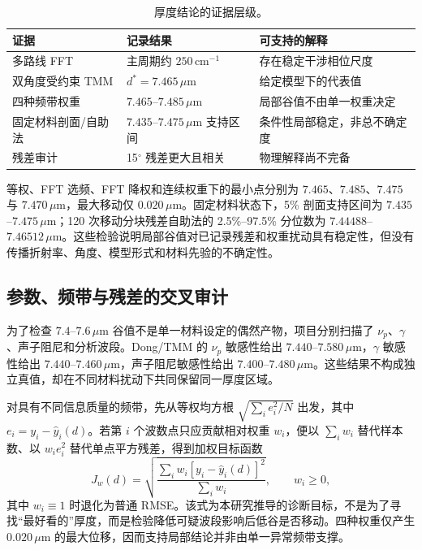 \documentclass[10pt,a4paper]{ctexart}
\newcommand{\um}{\ensuremath{\mu\mathrm{m}}}
\newcommand{\wn}{\ensuremath{\mathrm{cm}^{-1}}}
\begin{document}
\begin{table}[H]\centering\small
\caption{厚度结论的证据层级。}
\begin{tabular}{p{.34\linewidth}p{.25\linewidth}p{.30\linewidth}}\toprule
证据 & 记录结果 & 可支持的解释\\\midrule
多路线 FFT & 主周期约 $250\,\wn$ & 存在稳定干涉相位尺度\\
双角度受约束 TMM & $d^*=7.465\,\um$ & 给定模型下的代表值\\
四种频带权重 & $7.465$--$7.485\,\um$ & 局部谷值不由单一权重决定\\
固定材料剖面/自助法 & $7.435$--$7.475\,\um$ 支持区间 & 条件性局部稳定，非总不确定度\\
残差审计 & 15$^\circ$ 残差更大且相关 & 物理解释尚不完备\\\bottomrule
\end{tabular}
\end{table}

等权、FFT 选频、FFT 降权和连续权重下的最小点分别为 $7.465$、$7.485$、$7.475$ 与 $7.470\,\um$，最大移动仅 $0.020\,\um$。固定材料状态下，5\% 剖面支持区间为 $7.435$--$7.475\,\um$；120 次移动分块残差自助法的 2.5\%--97.5\% 分位数为 $7.44488$--$7.46512\,\um$。这些检验说明局部谷值对已记录残差和权重扰动具有稳定性，但没有传播折射率、角度、模型形式和材料先验的不确定性。

\subsection{参数、频带与残差的交叉审计}
为了检查 $7.4$--$7.6\,\um$ 谷值不是单一材料设定的偶然产物，项目分别扫描了 $\nu_p$、$\gamma$、声子阻尼和分析波段。Dong/TMM 的 $\nu_p$ 敏感性给出 $7.440$--$7.580\,\um$，$\gamma$ 敏感性给出 $7.440$--$7.460\,\um$，声子阻尼敏感性给出 $7.400$--$7.480\,\um$。这些结果不构成独立真值，却在不同材料扰动下共同保留同一厚度区域。

对具有不同信息质量的频带，先从等权均方根 $\sqrt{\sum_i e_i^2/N}$ 出发，其中 $e_i=y_i-\hat y_i(d)$。若第 $i$ 个波数点只应贡献相对权重 $w_i$，便以 $\sum_iw_i$ 替代样本数、以 $w_ie_i^2$ 替代单点平方残差，得到加权目标函数
\begin{equation}
J_w(d)=\sqrt{\frac{\sum_iw_i[y_i-\hat y_i(d)]^2}{\sum_iw_i}},\qquad w_i\geq0,
\label{eq:weighted-cn}
\end{equation}
其中 $w_i\equiv1$ 时退化为普通 RMSE。该式为本研究推导的诊断目标，不是为了寻找“最好看的”厚度，而是检验降低可疑波段影响后低谷是否移动。四种权重仅产生 $0.020\,\um$ 的最大位移，因而支持局部结论并非由单一异常频带支撑。
\end{document}
